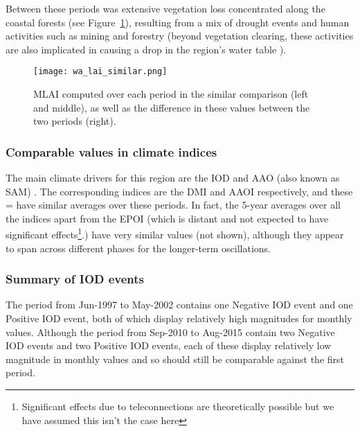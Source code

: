 Between these periods was extensive vegetation loss concentrated along the coastal forests (see Figure~\ref{fig:wa_lai_similar}), resulting from a mix of drought events and human activities such as mining and forestry (beyond vegetation clearing, these activities are also implicated in causing a drop in the region's water table \citep{bauxite_hydro, johnson2003}).

\begin{figure}[!ht]
	\centering
	\texttt{[image: wa\_lai\_similar.png]}
	\caption[MLAI similar comparison for WA focus region]{\ac{MLAI} computed over each period in the similar comparison (left and middle), as well as the difference in these values between the two periods (right).}
	\label{fig:wa_lai_similar}
\end{figure}

\subsubsection{Comparable values in climate indices}

The main climate drivers for this region are the \ac{IOD} and \ac{AAO} (also known as \ac{SAM}) \citep{wa_drivers}. The corresponding indices are the \ac{DMI} and \ac{AAOI} respectively, and these = have similar averages over these periods. In fact, the 5-year averages over all the indices apart from the \ac{EPOI} (which is distant and not expected to have significant effects\footnote{Significant effects due to teleconnections are theoretically possible but we have assumed this isn't the case here}.) have very similar values (not shown), although they appear to span across different phases for the longer-term oscillations.

\subsubsection{Summary of IOD events}

The period from Jun-1997 to May-2002 contains one Negative \ac{IOD} event and one Positive \ac{IOD} event, both of which display relatively high magnitudes for monthly values. Although the period from Sep-2010 to Aug-2015 contain two Negative \ac{IOD} events and two Positive \ac{IOD} events, each of these display relatively low magnitude in monthly values and so should still be comparable against the first period.

\enlargethispage{\baselineskip} %